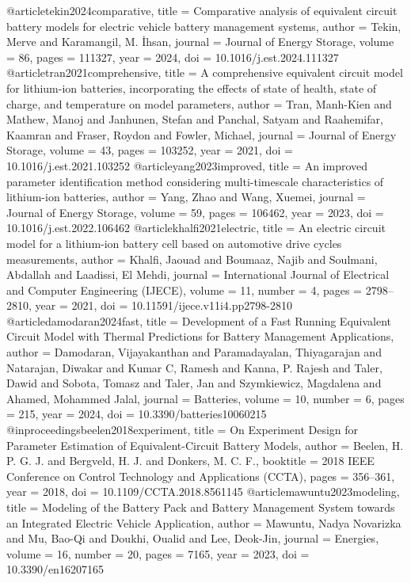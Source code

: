 @article{tekin2024comparative,
	title   = {Comparative analysis of equivalent circuit battery models for electric vehicle battery management systems},
	author  = {Tekin, Merve and Karamangil, M. İhsan},
	journal = {Journal of Energy Storage},
	volume  = {86},
	pages   = {111327},
	year    = {2024},
	doi     = {10.1016/j.est.2024.111327}
}
@article{tran2021comprehensive,
	title   = {A comprehensive equivalent circuit model for lithium-ion batteries, incorporating the effects of state of health, state of charge, and temperature on model parameters},
	author  = {Tran, Manh-Kien and Mathew, Manoj and Janhunen, Stefan and Panchal, Satyam and Raahemifar, Kaamran and Fraser, Roydon and Fowler, Michael},
	journal = {Journal of Energy Storage},
	volume  = {43},
	pages   = {103252},
	year    = {2021},
	doi     = {10.1016/j.est.2021.103252}
}
@article{yang2023improved,
	title   = {An improved parameter identification method considering multi-timescale characteristics of lithium-ion batteries},
	author  = {Yang, Zhao and Wang, Xuemei},
	journal = {Journal of Energy Storage},
	volume  = {59},
	pages   = {106462},
	year    = {2023},
	doi     = {10.1016/j.est.2022.106462}
}
@article{khalfi2021electric,
	title   = {An electric circuit model for a lithium-ion battery cell based on automotive drive cycles measurements},
	author  = {Khalfi, Jaouad and Boumaaz, Najib and Soulmani, Abdallah and Laadissi, El Mehdi},
	journal = {International Journal of Electrical and Computer Engineering (IJECE)},
	volume  = {11},
	number  = {4},
	pages   = {2798--2810},
	year    = {2021},
	doi     = {10.11591/ijece.v11i4.pp2798-2810}
}
@article{damodaran2024fast,
	title   = {Development of a Fast Running Equivalent Circuit Model with Thermal Predictions for Battery Management Applications},
	author  = {Damodaran, Vijayakanthan and Paramadayalan, Thiyagarajan and Natarajan, Diwakar and Kumar C, Ramesh and Kanna, P. Rajesh and Taler, Dawid and Sobota, Tomasz and Taler, Jan and Szymkiewicz, Magdalena and Ahamed, Mohammed Jalal},
	journal = {Batteries},
	volume  = {10},
	number  = {6},
	pages   = {215},
	year    = {2024},
	doi     = {10.3390/batteries10060215}
}
@inproceedings{beelen2018experiment,
	title     = {On Experiment Design for Parameter Estimation of Equivalent-Circuit Battery Models},
	author    = {Beelen, H. P. G. J. and Bergveld, H. J. and Donkers, M. C. F.},
	booktitle = {2018 IEEE Conference on Control Technology and Applications (CCTA)},
	pages     = {356--361},
	year      = {2018},
	doi       = {10.1109/CCTA.2018.8561145}
}
@article{mawuntu2023modeling,
	title   = {Modeling of the Battery Pack and Battery Management System towards an Integrated Electric Vehicle Application},
	author  = {Mawuntu, Nadya Novarizka and Mu, Bao-Qi and Doukhi, Oualid and Lee, Deok-Jin},
	journal = {Energies},
	volume  = {16},
	number  = {20},
	pages   = {7165},
	year    = {2023},
	doi     = {10.3390/en16207165}
}

